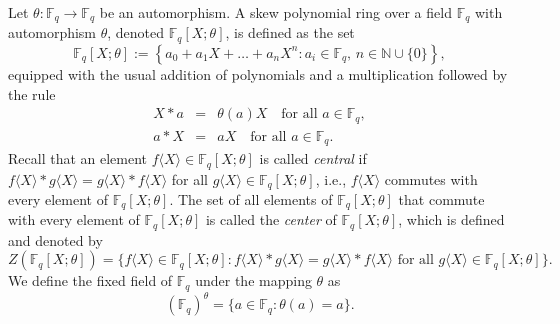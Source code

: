\documentclass[12pt]{article}
\begin{document}
%		
%
%
	Let \(\theta:\mathbb{F}_{q} \longrightarrow \mathbb{F}_{q}\) be an automorphism. A skew polynomial ring over a field \(\mathbb{F}_{q}\) with automorphism \(\theta\), denoted \(\mathbb{F}_{q}[X; \theta]\), is defined as the set  
\[
\mathbb{F}_{q}[X; \theta] := \left\{ a_0 + a_1 X + \dots + a_{n} X^{n} : a_i \in \mathbb{F}_{q}, \, n \in \mathbb{N}\cup\{0\} \right\},
\]  
equipped with the usual addition of polynomials and a multiplication followed by the rule  
\begin{eqnarray*}
	X * a &=& \theta(a) X \quad \text{for all } a \in \mathbb{F}_{q},\\
	a*X&=& aX \quad \text{for all } a \in \mathbb{F}_{q}.
\end{eqnarray*}
Recall that an element $f\langle X \rangle \in \mathbb{F}_{q}[X; \theta] $ is called \emph{central} if $f\langle X \rangle\ast g\langle X \rangle = g\langle X \rangle\ast f\langle X \rangle$ for all $g\langle X \rangle \in \mathbb{F}_{q}[X; \theta] $, 
i.e., $f\langle X \rangle$ commutes with every element of $\mathbb{F}_{q}[X; \theta] $. The set of all elements of $\mathbb{F}_{q}[X; \theta] $ that commute with every element of $\mathbb{F}_{q}[X; \theta] $ is called the \emph{center} of $\mathbb{F}_{q}[X; \theta] $, which is defined and denoted by
\[
Z(\mathbb{F}_{q}[X; \theta] ) = \{ f\langle X \rangle \in \mathbb{F}_{q}[X; \theta]  : f\langle X \rangle\ast g\langle X \rangle = g\langle X \rangle\ast f\langle X \rangle \text{ for all } g\langle X \rangle \in \mathbb{F}_{q}[X; \theta]  \}.
\]
 We define the fixed field of \(\mathbb{F}_q\) under the mapping \(\theta\) as
\[
(\mathbb{F}_q)^\theta = \{a \in \mathbb{F}_q : \theta(a) = a\}.
\]
\end{document}
